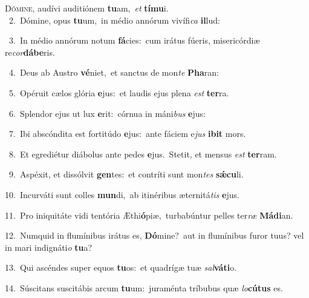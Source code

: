 \lettrine{\initial\textcolor{\initialcolor}{D}}{ómine,} audívi auditiónem \textbf{tu}\-am,~\star \textit{et} \textbf{tí}\-\textbf{mu}i.\\
{\numbfont\textcolor{\numbcolor}{~2.}}~Dómine, opus \textbf{tu}\-um,~\star in médio annórum vivífi\textit{ca} \textbf{il}\-lud:\par
{\numbfont\textcolor{\numbcolor}{~3.}}~In médio annórum notum \textbf{fá}\-cies:~\star cum irátus fúeris, misericórdiæ re\-\textit{cor}\-\textbf{dá}\textbf{be}ris.\par
{\numbfont\textcolor{\numbcolor}{~4.}}~Deus ab Austro \textbf{vé}\-niet,~\star et sanctus de mon\textit{te} \textbf{Pha}\-ran:\par
{\numbfont\textcolor{\numbcolor}{~5.}}~Opéruit cælos glória \textbf{e}\-jus:~\star et laudis ejus plena \textit{est} \textbf{ter}\-ra.\par
{\numbfont\textcolor{\numbcolor}{~6.}}~Splendor ejus ut lux \textbf{e}\-rit:~\star córnua in máni\textit{bus} \textbf{e}\-jus:\par
{\numbfont\textcolor{\numbcolor}{~7.}}~Ibi abscóndita est fortitúdo \textbf{e}\-jus:~\star ante fáciem e\textit{jus} \textbf{i}\-\textbf{bit} mors.\par
{\numbfont\textcolor{\numbcolor}{~8.}}~Et egrediétur diábolus ante pedes \textbf{e}\-jus.~\star Stetit, et mensus \textit{est} \textbf{ter}\-ram.\par
{\numbfont\textcolor{\numbcolor}{~9.}}~Aspéxit, et dissólvit \textbf{gen}\-tes:~\star et contríti sunt mon\textit{tes} \textbf{sǽ}\-\textbf{cu}li.\par
{\numbfont\textcolor{\numbcolor}{10.}}~Incurváti sunt colles \textbf{mun}\-di,~\star ab itinéribus æternitá\textit{tis} \textbf{e}\-jus.\par
{\numbfont\textcolor{\numbcolor}{11.}}~Pro iniquitáte vidi tentória Æthi\-\textbf{ó}\-piæ,~\star turbabúntur pelles ter\textit{ræ} \textbf{Má}\-\textbf{di}an.\par
{\numbfont\textcolor{\numbcolor}{12.}}~Numquid in flumínibus irátus es, \textbf{Dó}\-mine?~\star aut in flumínibus furor tuus? vel in mari indignáti\textit{o} \textbf{tu}\-a?\par
{\numbfont\textcolor{\numbcolor}{13.}}~Qui ascéndes super equos \textbf{tu}\-os:~\star et quadrígæ tuæ \textit{sal}\-\textbf{vá}\textbf{ti}o.\par
{\numbfont\textcolor{\numbcolor}{14.}}~Súscitans suscitábis arcum \textbf{tu}\-um:~\star juraménta tríbubus quæ \textit{lo}\-\textbf{cú}\textbf{tus} es.\par
